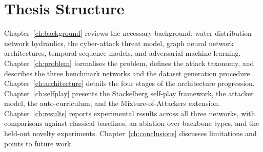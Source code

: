\section{Thesis Structure}
\label{sec:structure}

Chapter~\ref{ch:background} reviews the necessary background: water
distribution network hydraulics, the cyber-attack threat model,
graph neural network architectures, temporal sequence models, and
adversarial machine learning. Chapter~\ref{ch:problem} formalises
the problem, defines the attack taxonomy, and describes the three
benchmark networks and the dataset generation procedure.
Chapter~\ref{ch:architecture} details the four stages of the
architecture progression. Chapter~\ref{ch:selfplay} presents the
Stackelberg self-play framework, the attacker model, the
auto-curriculum, and the Mixture-of-Attackers extension.
Chapter~\ref{ch:results} reports experimental results across all
three networks, with comparisons against classical baselines, an
ablation over \gnn{} backbone types, and the held-out novelty
experiments. Chapter~\ref{ch:conclusions} discusses limitations and
points to future work.
